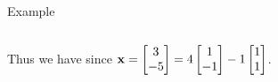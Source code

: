 \documentclass[xcolor=dvipsnames,aspectratio=169,t]{beamer}
\begin{document}
\begin{frame}{Example}
\begin{columns}[t]
{  Thus we have  since 
  $\displaystyle \mathbf{x} = \begin{bmatrix} 3 \\ -5 \end{bmatrix} = 4 \begin{bmatrix} 1 \\ -1 \end{bmatrix} -1  \begin{bmatrix} 1 \\ 1 \end{bmatrix}$.
  }
  \end{columns}
\end{frame}
\end{document}
